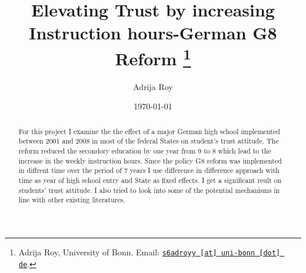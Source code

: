\documentclass[11pt, a4paper, leqno]{article}
\begin{document}
\title{Elevating Trust by increasing Instruction hours-German G8 Reform \thanks{Adrija Roy, University of Bonn. Email: \href{mailto:s6adroyy@uni-bonn.de}{\nolinkurl{s6adroyy [at] uni-bonn [dot] de}}.}}

\author{Adrija Roy}

\date{
    \today
}

\maketitle

\begin{abstract}
    For this project I examine the the effect of a major German high school implemented 
    between 2001 and 2008 in most of the federal States on student's trust attitude. The 
    reform reduced the secondory education by one year from 9 to 8 which lead to the increase
    in the weekly instruction hours. Since the policy G8 reform was implemented in diffrent 
    time over the period of 7 years I use difference in difference approach with time as 
    year of high school entry and State as fixed effects. I get a significant reult on 
    students' trust attitude. I also tried to look into some of the potential mechanisms 
    in line with other existing literatures.  
    
\end{abstract}

\clearpage
\end{document}
